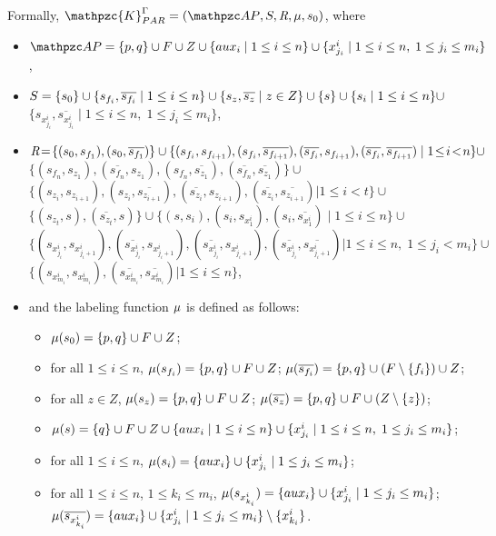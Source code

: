 Formally, $\mathpzc{K}_{PAR}^{\Gamma}=\KuDef$, where
\begin{itemize}
    \item $\Prop=\{p,q\}\cup F \cup Z \cup \{aux_i\mid 1\leq i\leq n\}\cup \{x^i_{j_i}\mid 1\leq i\leq n,\; 1\leq j_i\leq m_i\}$,
    \item $S=\{s_0\}\cup\{s_{f_i}, \overline{s_{f_i}}\mid 1\leq i\leq n\}\cup\{s_z,\overline{s_z} \mid z\in Z\}\cup\{s\}\cup\{s_i\mid 1\leq i\leq n\}\cup $ \\
    $\{s_{x^i_{j_i}}, \overline{s_{x^i_{j_i}}}\mid 1\leq i\leq n,\; 1\leq j_i\leq m_i\}$,
    \item $\textit{R}\!=\!\{(s_0,s_{f_1}),(s_0,\overline{s_{f_1}})\}\cup \{(s_{f_i},s_{f_{i+1}}),(s_{f_i},\overline{s_{f_{i+1}}}),(\overline{s_{f_i}},s_{f_{i+1}}),(\overline{s_{f_i}},\overline{s_{f_{i+1}}})\mid 1\!\leq\! i\!<\! n\} \cup$\\
    $\{(s_{f_n},s_{z_1}),(\overline{s_{f_n}},s_{z_1}),(s_{f_n},\overline{s_{z_1}}),(\overline{s_{f_n}},\overline{s_{z_1}})\}\cup$\\
    $\{(s_{z_i},s_{z_{i+1}}),(s_{z_i},\overline{s_{z_{i+1}}}),(\overline{s_{z_i}},s_{z_{i+1}}),(\overline{s_{z_i}},\overline{s_{z_{i+1}}})| 1\leq i< t\} \cup$\\
    $\{(s_{z_t},s),(\overline{s_{z_t}},s)\}\cup \{(s,s_i),(s_i,s_{x^i_1}),(s_i,\overline{s_{x^i_1}})\mid 1\leq i\leq n\}\cup$ \\
    $\{(s_{x^i_{j_i}},s_{x^i_{j_i+1}}), (\overline{s_{x^i_{j_i}}},s_{x^i_{j_i+1}}),(\overline{s_{x^i_{j_i}}},s_{x^i_{j_i+1}}),(\overline{s_{x^i_{j_i}}},\overline{s_{x^i_{j_i+1}}}) | 1\leq i\leq n,\; 1\leq j_i< m_i\}\cup$\\
    $\{(s_{x^i_{m_i}},s_{x^i_{m_i}}),(\overline{s_{x^i_{m_i}}},\overline{s_{x^i_{m_i}}})|1\leq i\leq n\}$,
    \item and the labeling function $\mu$ is defined as follows:
	\begin{itemize}
		\item $\mu(s_0)=\{p,q\}\cup F\cup Z$;
		\item for all $1\leq i\leq n$, $\mu(s_{f_i})=\{p,q\}\cup F\cup Z$; $\mu(\overline{s_{f_i}})=\{p,q\}\cup (F\setminus \{f_i\}) \cup Z$;
		\item for all $z\in Z$, $\mu(s_z)=\{p,q\}\cup F\cup Z$; $\mu(\overline{s_z})=\{p,q\}\cup F \cup (Z\setminus \{z\})$;
		\item $\mu(s)=\{q\}\cup F\cup Z \cup \{aux_i\mid 1\leq i\leq n\}\cup \{x^i_{j_i}\mid 1\leq i\leq n,\; 1\leq j_i\leq m_i\}$;
		\item for all $1\leq i\leq n$, $\mu(s_i)= \{aux_i\}\cup \{x^i_{j_i}\mid 1\leq j_i\leq m_i\}$;
		\item for all $1\leq i\leq n$, $1\leq k_i\leq m_i$, $\mu(s_{x^i_{k_i}})= \{aux_i\}\cup \{x^i_{j_i}\mid 1\leq j_i\leq m_i\}$;  $\mu(\overline{s_{x^i_{k_i}}})= \{aux_i\}\cup \{x^i_{j_i}\mid 1\leq j_i\leq m_i\}\setminus\{x^i_{k_i}\}$.
	\end{itemize}
\end{itemize}
